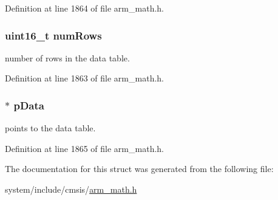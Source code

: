 Definition at line 1864 of file arm\+\_\+math.\+h.

\subsubsection[{\texorpdfstring{num\+Rows}{numRows}}]{\setlength{\rightskip}{0pt plus 5cm}uint16\+\_\+t num\+Rows}\hypertarget{structarm__bilinear__interp__instance__q31_a1bcf80ccdc2acc29198f1592ae300390}{}\label{structarm__bilinear__interp__instance__q31_a1bcf80ccdc2acc29198f1592ae300390}
number of rows in the data table. 

Definition at line 1863 of file arm\+\_\+math.\+h.

\subsubsection[{\texorpdfstring{p\+Data}{pData}}]{$\ast$ p\+Data}\hypertarget{structarm__bilinear__interp__instance__q31_ad296f76577326ff280726323536eed6d}{}\label{structarm__bilinear__interp__instance__q31_ad296f76577326ff280726323536eed6d}
points to the data table. 

Definition at line 1865 of file arm\+\_\+math.\+h.



The documentation for this struct was generated from the following file\+:\begin{DoxyCompactItemize}
\item 
system/include/cmsis/\hyperlink{arm__math_8h}{arm\+\_\+math.\+h}\end{DoxyCompactItemize}
